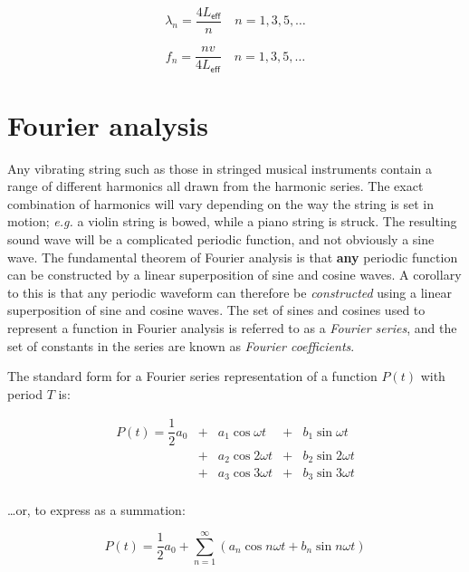 \documentclass[
]{book}
\begin{document}
\begin{equation}
\lambda_n = \frac{4 L_\textsf{eff}}{n} \quad n = 1,3,5,\dots
\end{equation}

\begin{equation}
f_n = \frac{nv}{4 L_\textsf{eff}} \quad n = 1,3,5,\dots
\end{equation}

\hypertarget{sec:ch11-fourieranalysis}{%
\chapter{Fourier analysis}\label{sec:ch11-fourieranalysis}}

Any vibrating string such as those in stringed musical instruments contain a range of different harmonics all drawn from the harmonic series. The exact combination of harmonics will vary depending on the way the string is set in motion; \emph{e.g.} a violin string is bowed, while a piano string is struck. The resulting sound wave will be a complicated periodic function, and not obviously a sine wave. The fundamental theorem of Fourier analysis is that \textbf{any} periodic function can be constructed by a linear superposition of sine and cosine waves. A corollary to this is that any periodic waveform can therefore be \emph{constructed} using a linear superposition of sine and cosine waves. The set of sines and cosines used to represent a function in Fourier analysis is referred to as a \emph{Fourier series}, and the set of constants in the series are known as \emph{Fourier coefficients}.

The standard form for a Fourier series representation of a function \(P(t)\) with period \(T\) is:

\begin{equation}
\begin{array}{rclcl}
P(t) = \dfrac{1}{2}a_0 & +& a_1 \cos \omega t &+& b_1 \sin \omega t \\
                      & + &a_2 \cos 2\omega t &+& b_2 \sin 2\omega t \\
                      & +& a_3 \cos 3\omega t &+& b_3 \sin 3\omega t \\
\end{array}
\end{equation}

\ldots or, to express as a summation:

\begin{equation}
P(t) = \frac{1}{2}a_{0} + \sum_{n=1}^{\infty}\left(a_{n}\cos n\omega t + b_{n}\sin n\omega t\right)
\end{equation}
\end{document}
